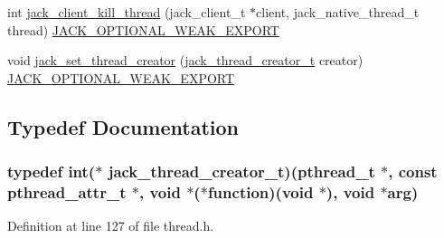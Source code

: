 \begin{DoxyCompactItemize}
int \hyperlink{group__ClientThreads_gad170c52942d07538dc0b3d4886405526}{jack\-\_\-client\-\_\-kill\-\_\-thread} (jack\-\_\-client\-\_\-t $\ast$client, jack\-\_\-native\-\_\-thread\-\_\-t thread) \hyperlink{weakmacros_8h_adf1bde0dd996bbf61a44311165014dd1}{\-J\-A\-C\-K\-\_\-\-O\-P\-T\-I\-O\-N\-A\-L\-\_\-\-W\-E\-A\-K\-\_\-\-E\-X\-P\-O\-R\-T}
\item 
void \hyperlink{group__ClientThreads_ga157ab0ade60e266ffd26ddffdb5545af}{jack\-\_\-set\-\_\-thread\-\_\-creator} (\hyperlink{group__ClientThreads_ga9f8adda8b9aad771b6b3bb663f798264}{jack\-\_\-thread\-\_\-creator\-\_\-t} creator) \hyperlink{weakmacros_8h_adf1bde0dd996bbf61a44311165014dd1}{\-J\-A\-C\-K\-\_\-\-O\-P\-T\-I\-O\-N\-A\-L\-\_\-\-W\-E\-A\-K\-\_\-\-E\-X\-P\-O\-R\-T}
\end{DoxyCompactItemize}


\subsection{\-Typedef \-Documentation}
\hypertarget{group__ClientThreads_ga9f8adda8b9aad771b6b3bb663f798264}{
\subsubsection[{jack\-\_\-thread\-\_\-creator\-\_\-t}]{\setlength{\rightskip}{0pt plus 5cm}typedef int($\ast$ {\bf jack\-\_\-thread\-\_\-creator\-\_\-t})(pthread\-\_\-t $\ast$, const pthread\-\_\-attr\-\_\-t $\ast$, void $\ast$($\ast$function)(void $\ast$), void $\ast$arg)}}\label{d3/d54/group__ClientThreads_ga9f8adda8b9aad771b6b3bb663f798264}


\-Definition at line 127 of file thread.\-h.



